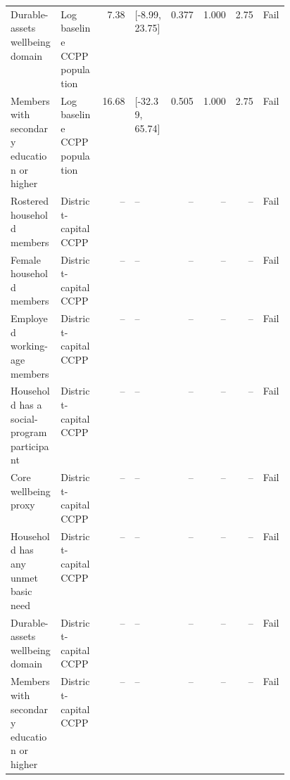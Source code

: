 \begin{longtable}{@{}p{0.18\linewidth}p{0.15\linewidth}rp{0.13\linewidth}rrrl@{}}
Durable-assets wellbeing domain & Log baseline CCPP population & 7.38 & [-8.99, 23.75] & 0.377 & 1.000 & 2.75 & Fail \\
Members with secondary education or higher & Log baseline CCPP population & 16.68 & [-32.39, 65.74] & 0.505 & 1.000 & 2.75 & Fail \\
Rostered household members & District-capital CCPP & -- & -- & -- & -- & -- & Fail \\
Female household members & District-capital CCPP & -- & -- & -- & -- & -- & Fail \\
Employed working-age members & District-capital CCPP & -- & -- & -- & -- & -- & Fail \\
Household has a social-program participant & District-capital CCPP & -- & -- & -- & -- & -- & Fail \\
Core wellbeing proxy & District-capital CCPP & -- & -- & -- & -- & -- & Fail \\
Household has any unmet basic need & District-capital CCPP & -- & -- & -- & -- & -- & Fail \\
Durable-assets wellbeing domain & District-capital CCPP & -- & -- & -- & -- & -- & Fail \\
Members with secondary education or higher & District-capital CCPP & -- & -- & -- & -- & -- & Fail \\
\end{longtable}
\endgroup
